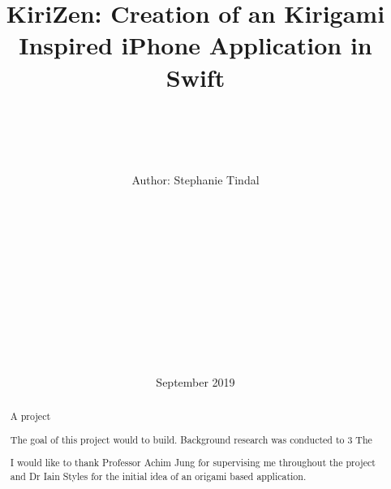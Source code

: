 \documentclass[11pt]{article}
\begin{document}
\begin{titlepage}
    \title{\vspace{40pt}\Huge KiriZen: Creation of an Kirigami Inspired iPhone Application in Swift}

    \author{ \\\hline \\\\\\ \Large \vspace{5pt} Author: Stephanie Tindal \\\Large \vspace{5pt}{Student ID: 1936508}\\\Large \vspace{50pt}{Supervisor: Achim Jung} \\ \hline\\\\\\  \vspace{5pt}{MSc Computer Science} \\ \vspace{5pt}{School of Computer Science, University of Birmingham}\\\\\\ \hline\\\\}

    \date{September 2019 \vspace{20pt}}
    \maketitle

\end{titlepage}
    \tableofcontents


\newpage

\begin{abstract}
    A project 
    
    The goal of this project would to build.
    Background research was conducted to 
    3
    The

\end{abstract}

\vspace{50pt}
\renewcommand{\abstractname}{Acknowledgements}
\begin{abstract}
    I would like to thank Professor Achim Jung for supervising me throughout the project and Dr Iain Styles for the initial idea of an origami based application. 
\end{abstract}
\end{document}

